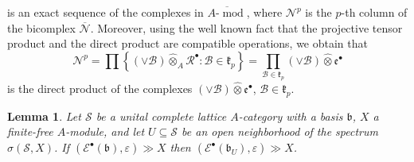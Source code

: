 \documentclass[12pt]{amsart}%
\theoremstyle{plain}
\newtheorem{lemma}{Lemma}
\numberwithin{equation}{section}
\numberwithin{equation}{section}
\numberwithin{theorem}{section}
\numberwithin{lemma}{section}
\numberwithin{remark}{section}
\numberwithin{example}{section}
\numberwithin{proposition}{section}
\numberwithin{definition}{section}
\numberwithin{corollary}{section}
\begin{document}
is an exact sequence of the complexes in $\overline{A\text{-}%
\operatorname*{mod}}$, where $\mathcal{N}^{p}$ is the $p$-th column of the
bicomplex $\overline{\mathcal{N}}$. Moreover, using the well known fact
\cite[Ch 2.5, Theorem 5.19]{HelHom} that the projective tensor product and the
direct product are compatible operations, we obtain that
\[
\mathcal{N}^{p}=\prod\left\{  \left(  \vee\mathcal{B}\right)  \widehat{\otimes
}_{A}\mathcal{R}^{\bullet}:\mathcal{B}\in\mathfrak{k}_{p}\right\}
=\prod_{\mathcal{B}\in\mathfrak{k}_{p}}\left(  \vee\mathcal{B}\right)
\widehat{\otimes}\mathfrak{e}^{\bullet}%
\]
is the direct product of the complexes $\left(  \vee\mathcal{B}\right)
\widehat{\otimes}\mathfrak{e}^{\bullet}$, $\mathcal{B}\in\mathfrak{k}_{p}$.

\begin{lemma}
\label{td1}Let $\mathcal{S}$ be a unital complete lattice $A$-category with a
basis $\mathfrak{b}$, $X$ a finite-free $A$-module, and let $U\subseteq
\mathcal{S}$ be an open neighborhood of the spectrum $\sigma\left(
\mathcal{S},X\right)  $. If $\left(  \mathcal{E}^{\bullet}\left(
\mathfrak{b}\right)  ,\varepsilon\right)  \gg X$ then $\left(  \mathcal{E}%
^{\bullet}\left(  \mathfrak{b}_{U}\right)  ,\varepsilon\right)  \gg X$.
\end{lemma}
\end{document}
